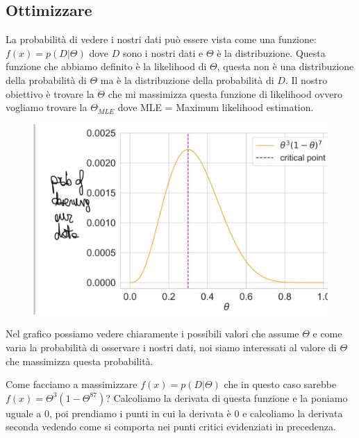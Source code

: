 \documentclass[14pt]{extreport}
\begin{document}
\subsection{Ottimizzare}
La probabilità di vedere i nostri dati può essere vista come una funzione: $f(x) = p(D|\Theta)$ dove $D$ sono i nostri dati e $\Theta$ è la
distribuzione. Questa funzione che abbiamo definito è la likelihood di $\Theta$, questa non è una distribuzione della probabilità di $\Theta$ ma è la
distribuzione della probabilità di $D$. Il nostro obiettivo è trovare la $\Theta$ che mi massimizza questa funzione di likelihood ovvero vogliamo
trovare la $\Theta_{MLE}$ dove MLE = Maximum likelihood estimation.
\begin{figure}[H]
\centering
  \includegraphics[width=0.7\linewidth]{15.jpeg}
\end{figure}

Nel grafico possiamo vedere chiaramente i possibili valori che assume $\Theta$ e come varia la probabilità di osservare i nostri dati, noi siamo
interessati al valore di $\Theta$ che massimizza questa probabilità.

Come facciamo a massimizzare $f(x) = p(D|\Theta)$ che in questo caso sarebbe $f(x) = \Theta^3(1-\Theta^87)$? Calcoliamo la derivata di questa funzione
e la poniamo uguale a 0, poi prendiamo i punti in cui la derivata è 0 e calcoliamo la derivata seconda vedendo come si comporta nei punti critici
evidenziati in precedenza.
\end{document}
